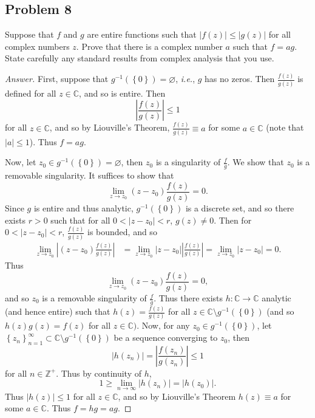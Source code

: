 \documentclass[12pt]{article}
\newcommand{\z}{\mathbb{Z}}
\newcommand{\cx}{\mathbb{C}}
\newcommand{\ita}[1]{\textit{#1}}
\newcommand\inv[1]{#1^{-1}}
\newcommand\paren[1]{\left( #1 \right)}
\newcommand\setb[1]{\left \{ #1 \right \}}
\theoremstyle{definition}
\begin{document}
\subsection{Problem 8}
Suppose that $f$ and $g$ are entire functions such that $|f(z)| \leq |g(z)|$ for all complex numbers $z$. Prove that there is a complex number $a$ such that $f = ag$. State carefully any standard results from complex analysis that you use.
\begin{proof}[Answer]
    First, suppose that $\inv{g} \paren{ \setb{ 0 } } = \varnothing$, \ita{i.e.}, $g$ has no zeros. Then $\frac{f(z)}{g(z)}$ is defined for all $z \in \cx$, and so is entire. Then 
    \[
        \left| \frac{f(z)}{g(z)} \right| \leq 1
    \]
    for all $z \in \cx$, and so by Liouville's Theorem, $\frac{f(z)}{g(z)} \equiv a$ for some $a \in \cx$ (note that $|a| \leq 1$). Thus $f = ag$. 
    
    Now, let $z_0 \in \inv{g} \paren{ \setb{ 0 } } = \varnothing$, then $z_0$ is a singularity of $\frac{f}{g}$. We show that $z_0$ is a removable singularity. It suffices to show that 
    \[
        \lim\limits_{z \to z_0} \paren{ z - z_0 } \frac{f(z)}{g(z)} = 0.
    \]
    Since $g$ is entire and thus analytic, $\inv{g} \paren{ \setb{ 0 } }$ is a discrete set, and so there exists $r > 0$ such that for all $0 < |z-z_0| < r$, $g(z) \neq 0$. Then for $0 < |z-z_0| < r$, $\frac{f(z)}{g(z)}$ is bounded, and so
    \begin{align*}
        \lim\limits_{z \to z_0} \left| \paren{ z - z_0 }  \frac{f(z)}{g(z)} \right| & = \lim\limits_{z \to z_0} \left| z - z_0 \right| \left| \frac{f(z)}{g(z)} \right| = \lim\limits_{z \to z_0} \left| z - z_0 \right| = 0.
    \end{align*}
    Thus 
    \[
        \lim\limits_{z \to z_0} \paren{ z - z_0 } \frac{f(z)}{g(z)} = 0,
    \]
    and so $z_0$ is a removable singularity of $\frac{f}{g}$. Thus there exists $h: \cx \to \cx$ analytic (and hence entire) such that $h(z) = \frac{f(z)}{g(z)}$ for all $z \in \cx \setminus \inv{g} \paren{ \setb{ 0 } }$ (and so $h(z)g(z) = f(z)$ for all $z \in \cx)$. Now, for any $z_0 \in \inv{g} \paren{ \setb{ 0 } }$, let $\setb{ z_n }_{n = 1}^{\infty} \subset \cx \setminus \inv{g} \paren{ \setb{ 0 } } $ be a sequence converging to $z_0$, then 
    \[
        \left| h \paren{ z_n } \right| = \left| \frac{ f \paren{ z_n } }{ g \paren{ z_n } }\right| \leq 1
    \]
    for all $n \in \z^+$. Thus by continuity of $h$, 
    \[
        1 \geq \lim\limits_{n \to \infty} \left| h \paren{ z_n } \right| = \left| h \paren{ z_0 } \right|.
    \]
    Thus $|h(z)| \leq 1$ for all $z \in \cx$, and so by Liouville's Theorem $h(z) \equiv a$ for some $a \in \cx$. Thus $f = hg = ag$.
\end{proof}
\newpage
\end{document}
